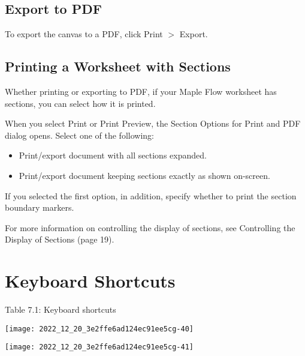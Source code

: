 \subsection{Export to PDF}
To export the canvas to a PDF, click Print $>$ Export.

\subsection{Printing a Worksheet with Sections}
Whether printing or exporting to PDF, if your Maple Flow worksheet has sections, you can select how it is printed.

When you select Print or Print Preview, the Section Options for Print and PDF dialog opens. Select one of the following:

\begin{itemize}
  \item Print/export document with all sections expanded.

  \item Print/export document keeping sections exactly as shown on-screen.

\end{itemize}

If you selected the first option, in addition, specify whether to print the section boundary markers.

For more information on controlling the display of sections, see Controlling the Display of Sections (page 19).

\section{Keyboard Shortcuts}
Table 7.1: Keyboard shortcuts

\begin{center}
\texttt{[image: 2022\_12\_20\_3e2ffe6ad124ec91ee5cg-40]}
\end{center}

\begin{center}
\texttt{[image: 2022\_12\_20\_3e2ffe6ad124ec91ee5cg-41]}
\end{center}


